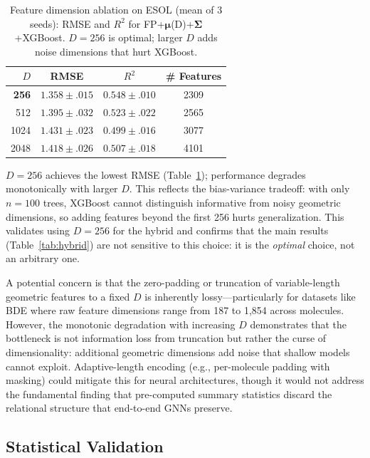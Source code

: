 \documentclass[sigconf]{acmart}
\newcommand{\rev}[1]{#1}
\begin{document}
\begin{table}[!htb]
\caption{\rev{Feature dimension ablation on ESOL (mean of 3 seeds): RMSE and $R^2$ for FP+$\boldsymbol{\mu}$(D)+$\boldsymbol{\Sigma}$+XGBoost. $D = 256$ is optimal; larger $D$ adds noise dimensions that hurt XGBoost.}}
\label{tab:featdim}
\centering
\small
\begin{tabular}{@{}rccc@{}}
\toprule
$D$ & RMSE & $R^2$ & \# Features \\
\midrule
\textbf{256}  & $\mathbf{1.358{\pm}.015}$ & $\mathbf{0.548{\pm}.010}$ & 2309 \\
512  & $1.395{\pm}.032$ & $0.523{\pm}.022$ & 2565 \\
1024 & $1.431{\pm}.023$ & $0.499{\pm}.016$ & 3077 \\
2048 & $1.418{\pm}.026$ & $0.507{\pm}.018$ & 4101 \\
\bottomrule
\end{tabular}
\end{table}

\rev{$D = 256$ achieves the lowest RMSE (Table~\ref{tab:featdim}); performance degrades monotonically with larger $D$. This reflects the bias-variance tradeoff: with only $n{=}100$ trees, XGBoost cannot distinguish informative from noisy geometric dimensions, so adding features beyond the first 256 hurts generalization. This validates using $D = 256$ for the hybrid and confirms that the main results (Table~\ref{tab:hybrid}) are not sensitive to this choice: it is the \emph{optimal} choice, not an arbitrary one.}

\rev{A potential concern is that the zero-padding or truncation of variable-length geometric features to a fixed $D$ is inherently lossy---particularly for datasets like BDE where raw feature dimensions range from 187 to 1,854 across molecules. However, the monotonic degradation with increasing $D$ demonstrates that the bottleneck is not information loss from truncation but rather the curse of dimensionality: additional geometric dimensions add noise that shallow models cannot exploit. Adaptive-length encoding (e.g., per-molecule padding with masking) could mitigate this for neural architectures, though it would not address the fundamental finding that pre-computed summary statistics discard the relational structure that end-to-end GNNs preserve.}

\FloatBarrier
\subsection{Statistical Validation}
\label{sec:stat}
\end{document}
